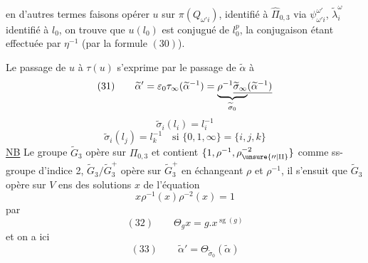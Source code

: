 en d'autres termes faisons opérer $u$ sur $\pi(Q_{\omega'i})$, identifié à $\widehat\Pi_{0,3}$ via $\psi_{\omega'i}^{\omega'}$, $\widetilde\lambda_i^\omega$ identifié à $l_0$, on trouve que $u(l_0)$ est conjugué de $l_0^p$,  la conjugaison étant effectuée par $\eta^{-1}$ (par la formule $(30)$).

Le passage de $u$ à $\tau(u)$ s'exprime par
le passage de $\widetilde\alpha$ à
\[
(31)\qquad\widetilde\alpha'=\varepsilon_0\tau_\infty(\widetilde\alpha^{-1})
={\underbrace{\rho^{-1}\underline{\widetilde\sigma_\infty\vphantom{(\widetilde\alpha^{-1})}}}_{\widetilde\sigma_0}}\underline{(\widetilde\alpha^{-1})\vphantom{\widetilde\sigma_\infty}}
\]
\[
\widetilde\sigma_i(l_i)=l_i^{-1}
\]
\[
\widetilde\sigma_i(l_j)=l_k^{-1}\quad\text{si }\{0,1,\infty\}=\{i,j,k\}
\]
\uline{NB} Le groupe $\widetilde G_3$ opère sur $\Pi_{0,3}$ et contient   $\{1,\rho^{-1},\rho^{-2}_{\unsure{\prime\prime|\mathrm{II}}}\}$ comme ss-groupe  d'indice 2,  $\widetilde G_3/\widetilde G_3^+$ opère sur $\widetilde G_3^+$ en échangeant $\rho$ et $\rho^{-1}$, il s'ensuit que $\widetilde G_3$ opère sur $V$ ens des solutions $x$ de l'équation
\[
x\rho^{-1}(x)\rho^{-2}(x)=1
\]
par
\[
(32)\qquad\Theta_g x=g.x^{\operatorname{sg}(g)}
\]
et on a ici
\[
(33)\qquad\widetilde\alpha'=\Theta_{\widetilde\sigma_0}(\widetilde\alpha)
\]

